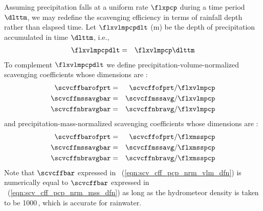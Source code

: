 \documentclass[12pt,twoside]{book}
\begin{document}
Assuming precipitation falls at a uniform rate $\flxpcp$ during a time
period $\dlttm$, we may redefine the scavenging efficiency in terms of
rainfall depth rather than elapsed time.
Let $\flxvlmpcpdlt$ (m) be the depth of precipitation accumulated in
time $\dlttm$, i.e., 
\begin{eqnarray}
\flxvlmpcpdlt & = & \flxvlmpcp \dlttm
\label{eqn:flx_vlm_pcp_dlt_dfn}
\end{eqnarray}
To complement $\flxvlmpcpdlt$ we define
precipitation-volume-normalized scavenging coefficients whose
dimensions are \xm:  
\begin{eqnarray}
\scvcffbarofprt & = & \scvcffofprt / \flxvlmpcp \\
\scvcffmssavgbar & = & \scvcffmssavg / \flxvlmpcp \\
\scvcffnbravgbar & = & \scvcffnbravg / \flxvlmpcp
\label{eqn:scv_cff_pcp_nrm_vlm_dfn}
\end{eqnarray}
and precipitation-mass-normalized scavenging coefficients whose
dimensions are \mSxkg:  
\begin{eqnarray}
\scvcffbarofprt & = & \scvcffofprt / \flxmsspcp \\
\scvcffmssavgbar & = & \scvcffmssavg / \flxmsspcp \\
\scvcffnbravgbar & = & \scvcffnbravg / \flxmsspcp
\label{eqn:scv_cff_pcp_nrm_mss_dfn}
\end{eqnarray}
Note that $\scvcffbar$ expressed in \xmm\
(\ref{eqn:scv_cff_pcp_nrm_vlm_dfn}) is numerically equal to
$\scvcffbar$ expressed in \mSxkg\ (\ref{eqn:scv_cff_pcp_nrm_mss_dfn}) 
as long as the hydrometeor density is taken to be 1000\,\kgxmC, which
is accurate for rainwater.
\end{document}

